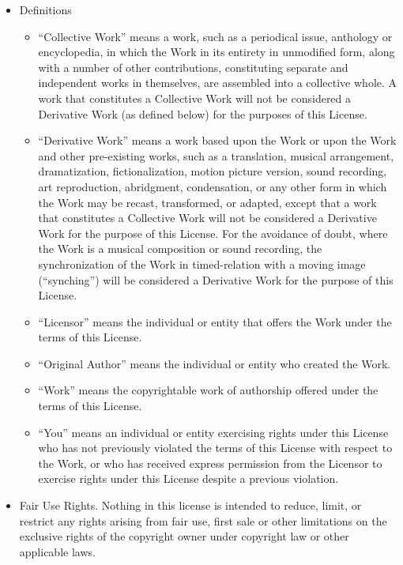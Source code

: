 \begin{itemize} \item Definitions

\begin{itemize} \item ``Collective Work'' means a work, such as a
periodical issue, anthology or encyclopedia, in which the Work in its
entirety in unmodified form, along with a number of other
contributions, constituting separate and independent works in
themselves, are assembled into a collective whole.  A work that
constitutes a Collective Work will not be considered a Derivative Work
(as defined below) for the purposes of this License.

\item ``Derivative Work'' means a work based upon the Work or upon the
Work and other pre-existing works, such as a translation, musical
arrangement, dramatization, fictionalization, motion picture version,
sound recording, art reproduction, abridgment, condensation, or any
other form in which the Work may be recast, transformed, or adapted,
except that a work that constitutes a Collective Work will not be
considered a Derivative Work for the purpose of this License.  For the
avoidance of doubt, where the Work is a musical composition or sound
recording, the synchronization of the Work in timed-relation with a
moving image (``synching'') will be considered a Derivative Work for
the purpose of this License.

\item ``Licensor'' means the individual or entity that offers the Work
under the terms of this License.

\item ``Original Author'' means the individual or entity who created
the Work.

\item ``Work'' means the copyrightable work of authorship offered under
the terms of this License.

\item ``You'' means an individual or entity exercising rights under
this License who has not previously violated the terms of this License
with respect to the Work, or who has received express permission from
the Licensor to exercise rights under this License despite a previous
violation.  \end{itemize}

\item Fair Use Rights.  Nothing in this license is intended to reduce,
limit, or restrict any rights arising from fair use, first sale or
other limitations on the exclusive rights of the copyright owner under
copyright law or other applicable laws.


\end{itemize}
